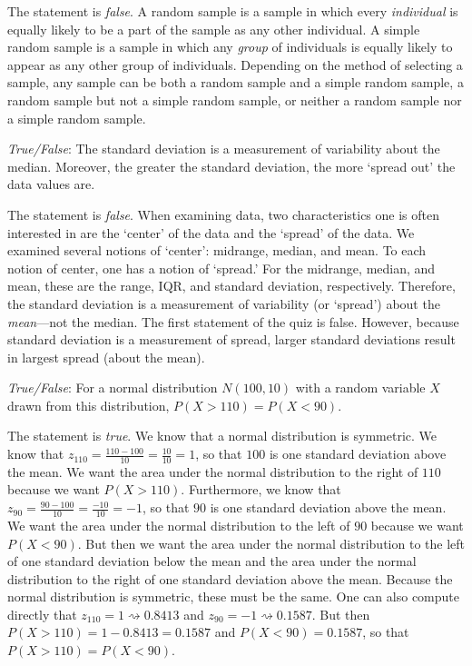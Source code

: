 \documentclass[11pt,letterpaper]{article}
\newcommand{\squiggle}{\rightsquigarrow}
\begin{document}
\sol The statement is \textit{false}. A random sample is a sample in which every \textit{individual} is equally likely to be a part of the sample as any other individual. A simple random sample is a sample in which any \textit{group} of individuals is equally likely to appear as any other group of individuals. Depending on the method of selecting a sample, any sample can be both a random sample and a simple random sample, a random sample but not a simple random sample, or neither a random sample nor a simple random sample. \pvspace{1.3cm}



\quizsol \textit{True/False}: The standard deviation is a measurement of variability about the median. Moreover, the greater the standard deviation, the more `spread out' the data values are. \pspace

\sol The statement is \textit{false}. When examining data, two characteristics one is often interested in are the `center' of the data and the `spread' of the data. We examined several notions of `center': midrange, median, and mean. To each notion of center, one has a notion of `spread.' For the midrange, median, and mean, these are the range, IQR, and standard deviation, respectively. Therefore, the standard deviation is a measurement of variability (or `spread') about the \textit{mean}---not the median. The first statement of the quiz is false. However, because standard deviation is a measurement of spread, larger standard deviations result in largest spread (about the mean). \pvspace{1.3cm}



\quizsol \textit{True/False}: For a normal distribution $N(100, 10)$ with a random variable $X$ drawn from this distribution, $P(X > 110)= P(X < 90)$. \pspace

\sol The statement is \textit{true}. We know that a normal distribution is symmetric. We know that $z_{110}= \frac{110 - 100}{10}= \frac{10}{10}= 1$, so that $100$ is one standard deviation above the mean. We want the area under the normal distribution to the right of $110$ because we want $P(X > 110)$. Furthermore, we know that $z_{90}= \frac{90 - 100}{10}= \frac{-10}{10}= -1$, so that $90$ is one standard deviation above the mean. We want the area under the normal distribution to the left of $90$ because we want $P(X < 90)$. But then we want the area under the normal distribution to the left of one standard deviation below the mean and the area under the normal distribution to the right of one standard deviation above the mean. Because the normal distribution is symmetric, these must be the same. One can also compute directly that $z_{110}= 1 \squiggle 0.8413$ and $z_{90}= -1 \squiggle 0.1587$. But then $P(X > 110)= 1 - 0.8413= 0.1587$ and $P(X < 90)= 0.1587$, so that $P(X > 110)= P(X < 90)$. 
\end{document}
